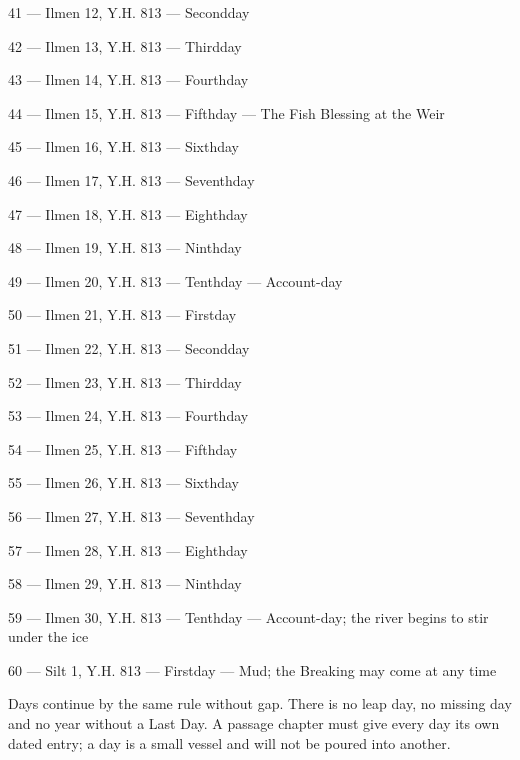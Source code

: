 \documentclass{design/chronicle}
\begin{document}
41 — Ilmen 12, Y.H. 813 — Secondday\par

42 — Ilmen 13, Y.H. 813 — Thirdday\par

43 — Ilmen 14, Y.H. 813 — Fourthday\par

44 — Ilmen 15, Y.H. 813 — Fifthday — The Fish Blessing at the Weir\par

45 — Ilmen 16, Y.H. 813 — Sixthday\par

46 — Ilmen 17, Y.H. 813 — Seventhday\par

47 — Ilmen 18, Y.H. 813 — Eighthday\par

48 — Ilmen 19, Y.H. 813 — Ninthday\par

49 — Ilmen 20, Y.H. 813 — Tenthday — Account-day\par

50 — Ilmen 21, Y.H. 813 — Firstday\par

51 — Ilmen 22, Y.H. 813 — Secondday\par

52 — Ilmen 23, Y.H. 813 — Thirdday\par

53 — Ilmen 24, Y.H. 813 — Fourthday\par

54 — Ilmen 25, Y.H. 813 — Fifthday\par

55 — Ilmen 26, Y.H. 813 — Sixthday\par

56 — Ilmen 27, Y.H. 813 — Seventhday\par

57 — Ilmen 28, Y.H. 813 — Eighthday\par

58 — Ilmen 29, Y.H. 813 — Ninthday\par

59 — Ilmen 30, Y.H. 813 — Tenthday — Account-day; the river begins to stir under the ice\par

60 — Silt 1, Y.H. 813 — Firstday — Mud; the Breaking may come at any time\par

Days continue by the same rule without gap. There is no leap day, no missing day and no year without a Last Day. A passage chapter must give every day its own dated entry; a day is a small vessel and will not be poured into another.
\end{document}
